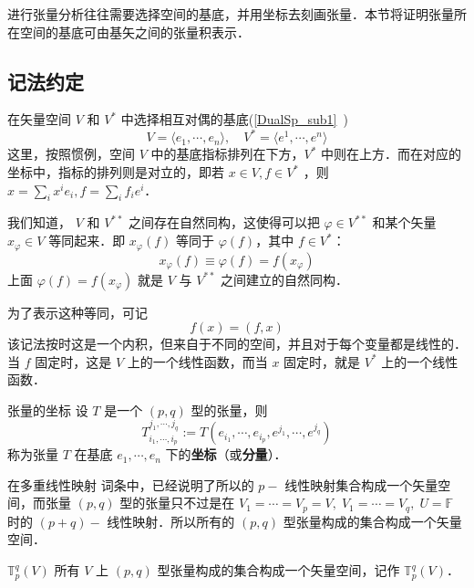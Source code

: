 
\begin{issues}
\issueDraft
\end{issues}

进行张量分析往往需要选择空间的基底，并用坐标去刻画张量．本节将证明张量所在空间的基底可由基矢之间的张量积表示．
\subsection{记法约定}
在矢量空间 $V$ 和 $V^*$ 中选择相互对偶的基底(\autoref{DualSp_sub1}~)
\begin{equation}
V=\langle e_1,\cdots ,e_n\rangle,\quad V^*=\langle e^1,\cdots,e^n\rangle
\end{equation}
这里，按照惯例，空间 $V$ 中的基底指标排列在下方，$V^*$ 中则在上方．而在对应的坐标中，指标的排列则是对立的，即若 $x\in V,f\in V^*$ ，则 $x=\sum_{i}x^i e_i,f=\sum_{i}f_ie^i$．

我们知道， $V$ 和 $V^{**}$ 之间存在自然同构，这使得可以把 $\varphi\in V^{**}$ 和某个矢量 $x_{\varphi}\in V$ 等同起来．即 $x_{\varphi}(f)$ 等同于 $\varphi(f)$，其中 $f\in V^*$：
\begin{equation}
x_{\varphi}(f)\equiv\varphi(f)=f(x_{\varphi})
\end{equation}
上面 $\varphi(f)=f(x_{\varphi})$ 就是 $V$ 与 $V^{**}$ 之间建立的自然同构．

为了表示这种等同，可记
\begin{equation}
f(x)=(f,x)
\end{equation}
该记法按时这是一个内积，但来自于不同的空间，并且对于每个变量都是线性的．当 $f$ 固定时，这是 $V$ 上的一个线性函数，而当 $x$ 固定时，就是 $V^{*}$ 上的一个线性函数．
\begin{definition}{张量的坐标}
设 $T$ 是一个 $(p,q)$ 型的张量，则
\begin{equation}
T^{j_1,\cdots,j_q}_{i_1,\cdots,i_p}:=T(e_{i_1},\cdots,e_{i_p},e^{j_1},\cdots,e^{j_q})
\end{equation}
称为张量 $T$ 在基底 ${e_1,\cdots,e_n}$ 下的\textbf{坐标}（或\textbf{分量}）．
\end{definition}

在多重线性映射 词条中，已经说明了所以的 $p-$ 线性映射集合构成一个矢量空间，而张量 $(p,q)$ 型的张量只不过是在 $V_1=\cdots=V_p=V,\;V_1=\cdots=V_q,\;U=\mathbb F$ 时的 $(p+q)-$ 线性映射．所以所有的 $(p,q)$ 型张量构成的集合构成一个矢量空间．
\begin{definition}{$\mathbb T^q_p(V)$}
所有 $V$ 上 $(p,q)$ 型张量构成的集合构成一个矢量空间，记作 $\mathbb T^q_p(V)$．
\end{definition} 
